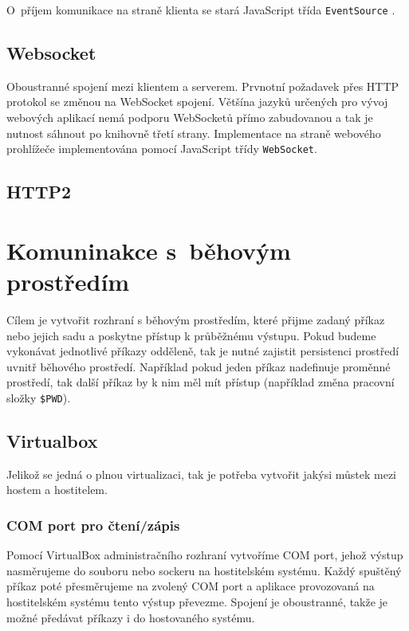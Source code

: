 O~příjem komunikace na straně klienta se stará JavaScript třída \verb|EventSource| \cite{sse_event_source}.

\subsection{Websocket}

Oboustranné spojení mezi klientem a serverem.
Prvnotní požadavek přes HTTP protokol se změnou na WebSocket spojení.
Většína jazyků určených pro vývoj webových aplikací nemá podporu WebSocketů přímo zabudovanou a tak je nutnost sáhnout po knihovně třetí strany.
Implementace na straně webového prohlížeče implementována pomocí JavaScript třídy \verb|WebSocket|.
\cite{websocket}

\subsection{HTTP2}


\section{Komuninakce s~běhovým prostředím}

Cílem je vytvořit rozhraní s běhovým prostředím, které přijme zadaný příkaz nebo jejich sadu a poskytne přístup k průběžnému výstupu.
Pokud budeme vykonávat jednotlivé příkazy odděleně, tak je nutné zajistit persistenci prostředí uvnitř běhového prostředí.
Například pokud jeden příkaz nadefinuje proměnné prostředí, tak další příkaz by k nim měl mít přístup (například změna pracovní složky \verb|$PWD|).

\subsection{Virtualbox}

Jelikož se jedná o plnou virtualizaci, tak je potřeba vytvořit jakýsi můstek mezi hostem a hostitelem.

\subsubsection{COM port pro čtení/zápis}

Pomocí VirtualBox administračního rozhraní vytvoříme COM port, jehož výstup nasměrujeme do souboru nebo sockeru na hostitelském systému.
Každý spuštěný příkaz poté přesměrujeme na zvolený COM port a aplikace provozovaná na hostitelském systému tento výstup převezme.
Spojení je oboustranné, takže je možné předávat příkazy i do hostovaného systému.
\cite{virtualbox_serial}

